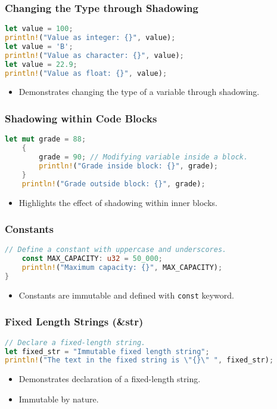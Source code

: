 \documentclass[aspectratio=169, table]{beamer}
\begin{document}
\begin{frame}[fragile]
\frametitle{Changing the Type through Shadowing}
\begin{lstlisting}[language=Rust]
let value = 100;
println!("Value as integer: {}", value);
let value = 'B';
println!("Value as character: {}", value);
let value = 22.9;
println!("Value as float: {}", value);
\end{lstlisting}
\begin{itemize}
\item Demonstrates changing the type of a variable through shadowing.
\end{itemize}
\end{frame}

\begin{frame}[fragile]
\frametitle{Shadowing within Code Blocks}
\begin{lstlisting}[language=Rust]
	let mut grade = 88;
	{
		grade = 90; // Modifying variable inside a block.
		println!("Grade inside block: {}", grade);
	}
	println!("Grade outside block: {}", grade);
\end{lstlisting}
\begin{itemize}
	\item Highlights the effect of shadowing within inner blocks.
\end{itemize}
\end{frame}

\begin{frame}[fragile]
\frametitle{Constants}
\begin{lstlisting}[language=Rust]
	// Define a constant with uppercase and underscores.
	const MAX_CAPACITY: u32 = 50_000;
	println!("Maximum capacity: {}", MAX_CAPACITY);
}
\end{lstlisting}
\begin{itemize}
\item Constants are immutable and defined with \texttt{const} keyword.
\end{itemize}
\end{frame}

\begin{frame}[fragile]
\frametitle{Fixed Length Strings (\&str)}
\begin{lstlisting}[language=Rust]
// Declare a fixed-length string.
let fixed_str = "Immutable fixed length string";
println!("The text in the fixed string is \"{}\" ", fixed_str);
\end{lstlisting}
\begin{itemize}
\item Demonstrates declaration of a fixed-length string.
\item Immutable by nature.
\end{itemize}
\end{frame}
\end{document}
